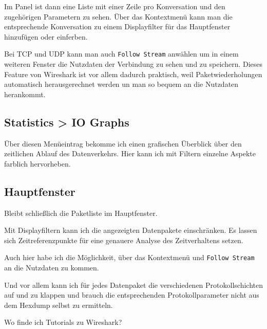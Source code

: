 \begin{normaltext}
  Im Panel ist dann eine Liste mit einer Zeile pro Konversation und den
  zugehörigen Parametern zu sehen. Über das Kontextmenü kann man die
  entsprechende Konversation zu einem Displayfilter für das Hauptfenster
  hinzufügen oder einferben.
  
  Bei TCP und UDP kann man auch \verb?Follow Stream? anwählen um in einem
  weiteren Fenster die Nutzdaten der Verbindung zu sehen und zu speichern.
  Dieses Feature von Wireshark ist vor allem dadurch praktisch, weil
  Paketwiederholungen automatisch herausgerechnet werden un man so bequem an
  die Nutzdaten herankommt.

  \subsection*{Statistics > IO Graphs}
  Über diesen Menüeintrag bekomme ich einen grafischen Überblick über den
  zeitlichen Ablauf des Datenverkehrs. Hier kann ich mit Filtern einzelne
  Aspekte farblich hervorheben.

  \subsection*{Hauptfenster}
  Bleibt schließlich die Paketliste im Hauptfenster.

  Mit Displayfiltern kann ich die angezeigten Datenpakete einschränken. Es
  lassen sich Zeitreferenzpunkte für eine genauere Analyse des Zeitverhaltens
  setzen.

  Auch hier habe ich die Möglichkeit, über das Kontextmenü und
  \verb?Follow Stream? an die Nutzdaten zu kommen.

  Und vor allem kann ich für jedes Datenpaket die verschiedenen
  Protokollschichten auf und zu klappen und  brauch die entsprechenden
  Protokollparameter nicht aus dem Hexdump selbst zu ermitteln.
\end{normaltext}
\begin{notes}
\item Wo finde ich Tutorials zu Wireshark?
\end{notes}

